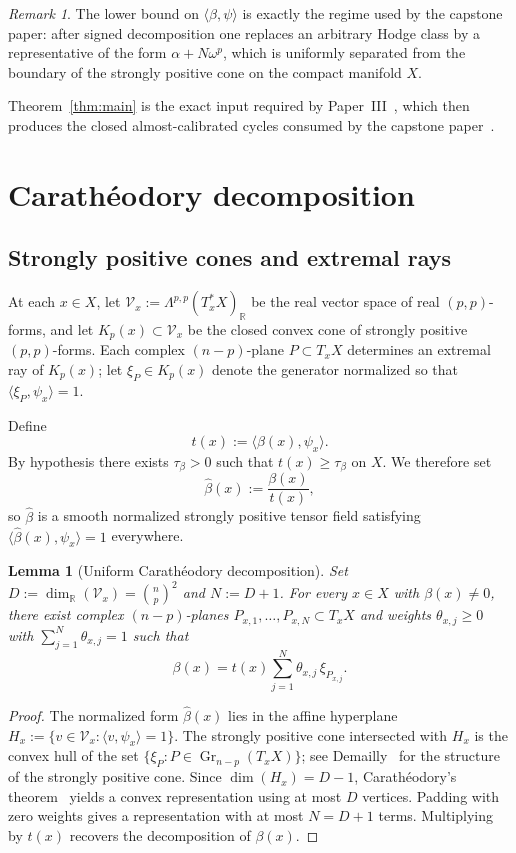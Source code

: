 \documentclass[11pt]{article}
\numberwithin{equation}{section}
\theoremstyle{plain}
\newtheorem{lemma}[theorem]{Lemma}
\theoremstyle{definition}
\theoremstyle{remark}
\newtheorem{remark}[theorem]{Remark}
\DeclareMathOperator{\Gr}{Gr}
\newcommand{\R}{\mathbb{R}}
\newcommand{\calV}{\mathcal{V}}
\begin{document}
\begin{remark}
The lower bound on $\langle\beta,\psi\rangle$ is exactly the regime used by the capstone paper: after signed decomposition one replaces an arbitrary Hodge class by a representative of the form $\alpha+N\omega^p$, which is uniformly separated from the boundary of the strongly positive cone on the compact manifold $X$.
\end{remark}

Theorem~\ref{thm:main} is the exact input required by Paper~III~\cite[Thm.~1.1]{Washburn26III}, which then produces the closed almost-calibrated cycles consumed by the capstone paper~\cite{Washburn26IV}.

\section{Carath\'eodory decomposition}\label{sec:caratheodory}

\subsection{Strongly positive cones and extremal rays}

At each $x\in X$, let $\calV_x:=\Lambda^{p,p}(T_x^*X)_{\R}$ be the real vector space of real $(p,p)$-forms, and let $K_p(x)\subset \calV_x$ be the closed convex cone of strongly positive $(p,p)$-forms.  Each complex $(n-p)$-plane $P\subset T_xX$ determines an extremal ray of $K_p(x)$; let $\xi_P\in K_p(x)$ denote the generator normalized so that $\langle \xi_P,\psi_x\rangle=1$.

Define
\[
t(x):=\langle \beta(x),\psi_x\rangle.
\]
By hypothesis there exists $\tau_\beta>0$ such that $t(x)\ge \tau_\beta$ on $X$.  We therefore set
\[
\widehat\beta(x):=\frac{\beta(x)}{t(x)},
\]
so $\widehat\beta$ is a smooth normalized strongly positive tensor field satisfying $\langle \widehat\beta(x),\psi_x\rangle=1$ everywhere.

\begin{lemma}[Uniform Carath\'eodory decomposition]\label{lem:caratheodory}
Set $D:=\dim_{\R}(\calV_x)=\binom{n}{p}^2$ and $N:=D+1$.  For every $x\in X$ with $\beta(x)\ne 0$, there exist complex $(n-p)$-planes $P_{x,1},\dots,P_{x,N}\subset T_xX$ and weights $\theta_{x,j}\ge 0$ with $\sum_{j=1}^N \theta_{x,j}=1$ such that
\[
\beta(x)=t(x)\sum_{j=1}^N \theta_{x,j}\,\xi_{P_{x,j}}.
\]
\end{lemma}

\begin{proof}
The normalized form $\widehat\beta(x)$ lies in the affine hyperplane $H_x:=\{v\in\calV_x:\langle v,\psi_x\rangle=1\}$.  The strongly positive cone intersected with $H_x$ is the convex hull of the set $\{\xi_P:P\in \Gr_{n-p}(T_xX)\}$; see Demailly~\cite[\S~III.1]{Demailly12} for the structure of the strongly positive cone.  Since $\dim(H_x)=D-1$, Carath\'eodory's theorem~\cite{Schneider14} yields a convex representation using at most $D$ vertices.  Padding with zero weights gives a representation with at most $N=D+1$ terms.  Multiplying by $t(x)$ recovers the decomposition of $\beta(x)$.
\end{proof}
\end{document}
